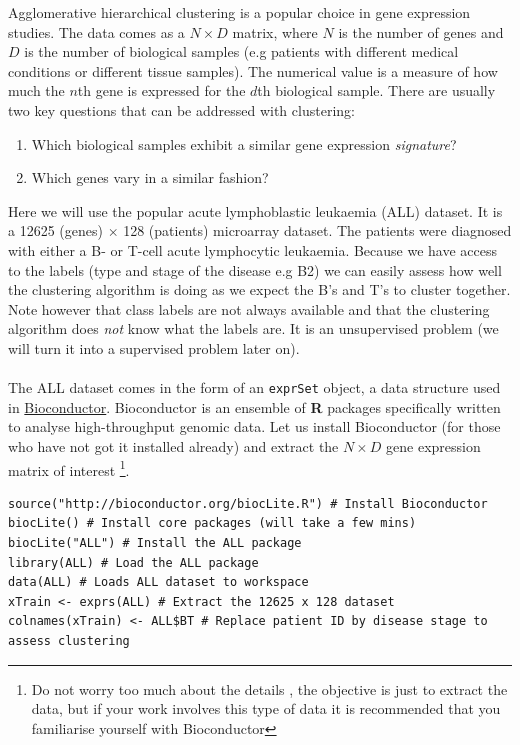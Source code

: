 \documentclass[a4paper,11pt]{article}
\begin{document}
Agglomerative hierarchical clustering is a popular choice in gene expression studies.
The data comes as a $N \times D$ matrix, where $N$ is the number of genes and $D$ is 
the number of biological samples (e.g patients with different medical conditions or 
different tissue samples). The numerical value is a measure of how much the $n$th gene
is expressed for the $d$th biological sample. There are usually two key questions that
can be addressed with clustering:

\begin{enumerate}
	\item Which biological samples exhibit a similar gene expression \textit{signature}?
	\item Which genes vary in a similar fashion?
\end{enumerate} 

Here we will use the popular acute lymphoblastic leukaemia (ALL) dataset. It is a
12625 (genes) $\times$ 128 (patients) microarray dataset. The patients were diagnosed with 
either a B- or T-cell acute lymphocytic leukaemia. Because we have access to the labels 
(type and stage of the disease e.g B2) we can easily assess how well the clustering 
algorithm is doing as we expect the B's and T's to cluster together. Note however 
that class labels are not always available and that the clustering algorithm 
does \textit{not} know what the labels are. It is an unsupervised problem 
(we will turn it into a supervised problem later on).
\\\\
The ALL dataset comes in the form of an {\lstinline[style=RCode, basicstyle=\normalsize\ttfamily] |exprSet|} object,
a data structure used in \href{http://www.bioconductor.org}{Bioconductor}. Bioconductor is
an ensemble of \textbf{R} packages specifically written to analyse high-throughput genomic data.
Let us install Bioconductor (for those who have not got it installed already) and extract
the $N \times D$ gene expression matrix of interest \footnote{Do not worry too much about the details
, the objective is just to extract the data, but if your work involves this type of data it is 
recommended that you familiarise yourself with Bioconductor}.
\\
\begin{lstlisting}[style=RCode]
source("http://bioconductor.org/biocLite.R") # Install Bioconductor
biocLite() # Install core packages (will take a few mins)
biocLite("ALL") # Install the ALL package
library(ALL) # Load the ALL package
data(ALL) # Loads ALL dataset to workspace
xTrain <- exprs(ALL) # Extract the 12625 x 128 dataset
colnames(xTrain) <- ALL$BT # Replace patient ID by disease stage to assess clustering
\end{lstlisting}
\end{document}
